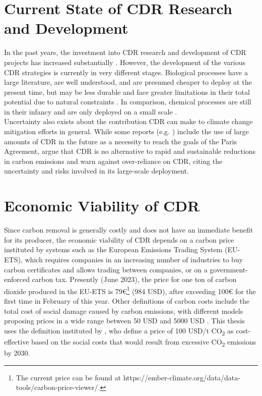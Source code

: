 \section{Current State of CDR Research and Development}
In the past years, the investment into CDR research and development of CDR projects has increased substantially \parencite{Smith2023TheEdition}. However, the development of the various CDR strategies is currently in very different stages. Biological processes have a large literature, are well understood, and are presumed cheaper to deploy at the present time, but may be less durable and face greater limitations in their total potential due to natural constraints \parencite{Fuss2018NegativeEffects}. In comparison, chemical processes are still in their infancy and are only deployed on a small scale \parencite{Smith2023TheEdition}.\\
Uncertainty also exists about the contribution CDR can make to climate change mitigation efforts in general. While some reports (e.g. \textcite{NAS2018NegativeAgenda}) include the use of large amounts of CDR in the future as a necessity to reach the goals of the Paris Agreement, \textcite{Fuss2018NegativeEffects} argue that CDR is no alternative to rapid and sustainable reductions in carbon emissions and warn against over-reliance on CDR, citing the uncertainty and risks involved in its large-scale deployment.\\
\section{Economic Viability of CDR}
Since carbon removal is generally costly and does not have an immediate benefit for its producer, the economic viability of CDR depends on a carbon price instituted by systems such as the European Emissions Trading System (EU-ETS), which requires companies in an increasing number of industries to buy carbon certificates and allows trading between companies, or on a government-enforced carbon tax. Presently (June 2023), the price for one ton of carbon dioxide produced in the EU-ETS is 79€\footnote{The current price can be found at https://ember-climate.org/data/data-tools/carbon-price-viewer/.} (984 USD), after exceeding 100€ for the first time in February of this year. Other definitions of carbon costs include the total cost of social damage caused by carbon emissions, with different models proposing prices in a wide range between 50 USD and 5000 USD \parencite{Kikstra2021TheVariability}. This thesis uses the definition instituted by \textcite{Griscom2017NaturalSolutions}, who define a price of 100 USD/t CO\textsubscript{2} as cost-effective based on the social costs that would result from excessive CO\textsubscript{2} emissions by 2030.